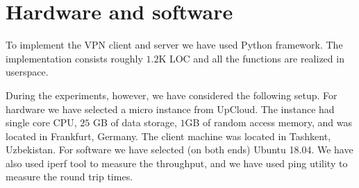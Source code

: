 \section{Hardware and software}
\label{sec:hardware}

To implement the VPN client and server we have used Python framework. The implementation
consists roughly $1.2$K LOC and all the functions are realized in userspace.

During the experiments, however, we have considered the following setup.
For hardware we have selected a micro instance from UpCloud. The instance had 
single core CPU, $25$ GB of data storage, $1$GB of random access memory, and was 
located in Frankfurt, Germany. The client machine was located in Tashkent, Uzbekistan. 
For software we have selected (on both ends) Ubuntu 18.04. We have also used iperf tool 
to measure the throughput, and we have used ping utility to measure the round trip times. 

